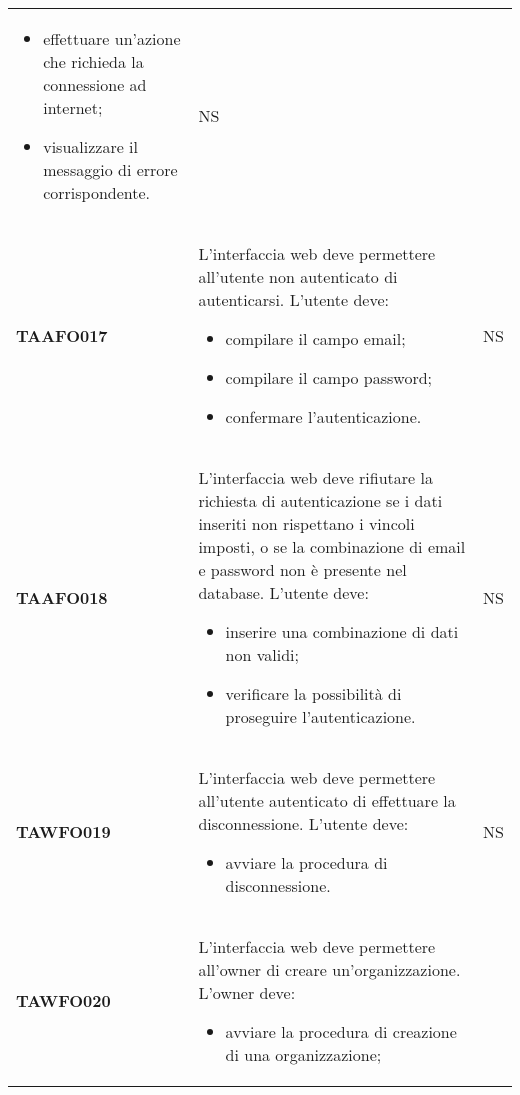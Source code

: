 \documentclass[../piano-di-qualifica.tex]{subfiles}
\begin{document}
\begin{centering}
\begin{longtable}[H]{>{\centering\bfseries}m{3cm} >{}p{10cm} >{\centering\arraybackslash}m{3cm}}
\begin{itemize}
                        \item effettuare un'azione che richieda la connessione ad internet;
                        \item visualizzare il messaggio di errore corrispondente.
                      \end{itemize}
                      & NS \\
        TAAFO017      & L’interfaccia web deve permettere all’utente non autenticato di autenticarsi. \newline
                      L’utente deve:
                      \begin{itemize}
                        \item compilare il campo email;
                        \item compilare il campo password;
                        \item confermare l'autenticazione.
                      \end{itemize}
                      & NS \\
        TAAFO018      & L’interfaccia web deve rifiutare la richiesta di autenticazione se i dati inseriti non rispettano i vincoli imposti, o se la combinazione di email e password non è presente nel database. \newline
                      L’utente deve:
                      \begin{itemize}
                        \item inserire una combinazione di dati non validi;
                        \item verificare la possibilità di proseguire l'autenticazione.
                      \end{itemize}
                      & NS \\
        TAWFO019      & L’interfaccia web deve permettere all’utente autenticato di effettuare la disconnessione. \newline
        L’utente deve:
        \begin{itemize}
         \item avviare la procedura di disconnessione.
        \end{itemize}
        & NS \\
        TAWFO020      & L’interfaccia web deve permettere all’owner di creare un’organizzazione. \newline
        L’owner deve:
        \begin{itemize}
         \item avviare la procedura di creazione di una organizzazione;

\end{itemize}
\end{longtable}
\end{centering}
\end{document}

